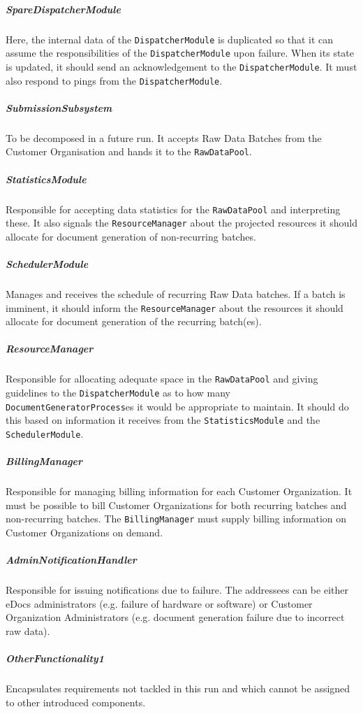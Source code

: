 \documentclass[a4paper,10pt]{article}
\begin{document}
\subparagraph{SpareDispatcherModule}
Here, the internal data of the \texttt{DispatcherModule} is duplicated so that it can assume the responsibilities of the \texttt{DispatcherModule} upon failure. When its state is updated, it should send an acknowledgement to the \texttt{DispatcherModule}. It must also respond to pings from the \texttt{DispatcherModule}.

\subparagraph{SubmissionSubsystem}
To be decomposed in a future run. It accepts Raw Data Batches from the Customer Organisation and hands it to the \texttt{RawDataPool}.

\subparagraph{StatisticsModule}
Responsible for accepting data statistics for the \texttt{RawDataPool} and interpreting these. It also signals the \texttt{ResourceManager} about the projected resources it should allocate for document generation of non-recurring batches.

\subparagraph{SchedulerModule}
Manages and receives the schedule of recurring Raw Data batches. If a batch is imminent, it should inform the \texttt{ResourceManager} about the resources it should allocate for document generation of the recurring batch(es).

\subparagraph{ResourceManager}
Responsible for allocating adequate space in the \texttt{RawDataPool} and giving guidelines to the \texttt{DispatcherModule} as to how many \texttt{DocumentGeneratorProcess}es it would be appropriate to maintain. It should do this based on information it receives from the \texttt{StatisticsModule} and the \texttt{SchedulerModule}.

\subparagraph{BillingManager}
Responsible for managing billing information for each Customer Organization. It must be possible to bill Customer Organizations for both recurring batches and non-recurring batches. The \texttt{BillingManager} must supply billing information on Customer Organizations on demand.

\subparagraph{AdminNotificationHandler}
Responsible for issuing notifications due to failure. The addressees can be either eDocs administrators (e.g. failure of hardware or software) or Customer Organization Administrators (e.g. document generation failure due to incorrect raw data).

\subparagraph{OtherFunctionality1}
Encapsulates requirements not tackled in this run and which cannot be
assigned to other introduced components.
\end{document}
